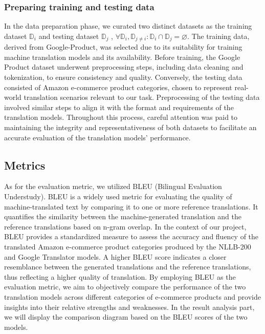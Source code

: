\documentclass[sigconf]{acmart}
\begin{document}
\subsubsection{Preparing training and testing data}
In the data preparation phase, we curated two distinct datasets as the training dataset $\mathbb{D}_i$ and testing dataset $\mathbb{D}_j$ , $\forall\mathbb{D}_i,\mathbb{D}_{j\neq{i}}:\mathbb{D}_i\cap\mathbb{D}_j=\varnothing$. The training data\cite{moore_lewis_2010}, derived from Google-Product, was selected due to its suitability for training machine translation models and its availability. Before training, the Google Product dataset underwent preprocessing steps, including data cleaning and tokenization, to ensure consistency and quality. Conversely, the testing data\cite{demillo_lipton_sayward_1978} consisted of Amazon e-commerce product categories, chosen to represent real-world translation scenarios relevant to our task. Preprocessing of the testing data involved similar steps to align it with the format and requirements of the translation models. Throughout this process, careful attention was paid to maintaining the integrity and representativeness of both datasets to facilitate an accurate evaluation of the translation models' performance.


\subsection{Metrics}
As for the evaluation metric, we utilized BLEU (Bilingual Evaluation Understudy)\cite{papineni_roukos_ward_zhu_2002}. BLEU is a widely used metric for evaluating the quality of machine-translated text by comparing it to one or more reference translations. It quantifies the similarity between the machine-generated translation and the reference translations based on n-gram overlap. In the context of our project, BLEU provides a standardized measure to assess the accuracy and fluency of the translated Amazon e-commerce product categories produced by the NLLB-200 and Google Translator models. A higher BLEU score\cite{mathur_baldwin_cohn_2020} indicates a closer resemblance between the generated translations and the reference translations, thus reflecting a higher quality of translation. By employing BLEU as the evaluation metric, we aim to objectively compare the performance of the two translation models across different categories of e-commerce products and provide insights into their relative strengths and weaknesses. In the result analysis part, we will display the comparison diagram based on the BLEU scores of the two models.
\end{document}
